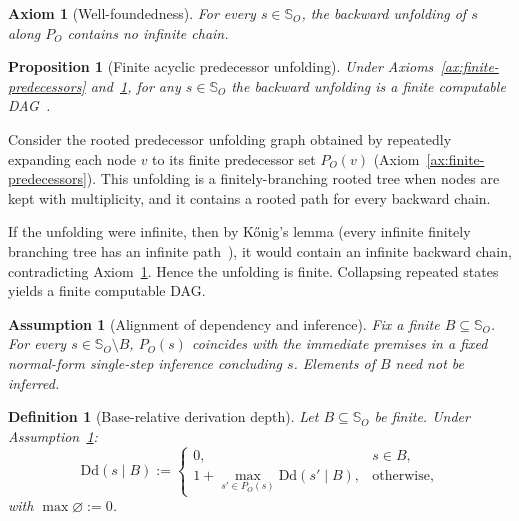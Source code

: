 \documentclass[journal]{IEEEtran}
\makeatletter
\newcommand{\Dd}{\text{Dd}}
\newtheorem{axiom}{Axiom}[section]
\newtheorem{assumption}{Assumption}[section]
\newtheorem{proposition}{Proposition}[section]
\newtheorem{definition}{Definition}[section]
\numberwithin{equation}{section}
\renewenvironment{proof}[1][\proofname]{\par
  \pushQED{\qed}%
  \normalfont \topsep6\p@\@plus6\p@\relax
  \trivlist
  \item[\hskip\labelsep
        \itshape
    #1\@addpunct{.}]\ignorespaces
}{%
  \popQED\endtrivlist\@endpefalse
}
\makeatother
\begin{document}
\begin{axiom}[Well-foundedness]
\label{ax:wellfounded-predecessor}
For every $s\in\mathbb S_O$, the backward unfolding of $s$ along
$P_O$ contains no infinite chain.
\end{axiom}

\begin{proposition}[Finite acyclic predecessor unfolding]
\label{prop:no-cycle-dag}
Under Axioms~\ref{ax:finite-predecessors}
and~\ref{ax:wellfounded-predecessor}, for any $s\in\mathbb S_O$
the backward unfolding is a finite computable
DAG~\cite{kunen2014set}.
\end{proposition}

\begin{proof}
Consider the rooted predecessor unfolding graph obtained by repeatedly expanding
each node \(v\) to its finite predecessor set \(P_O(v)\) (Axiom~\ref{ax:finite-predecessors}).
This unfolding is a finitely-branching rooted tree when nodes are kept with
multiplicity, and it contains a rooted path for every backward chain.

If the unfolding were infinite, then by K\H{o}nig's lemma (every infinite finitely
branching tree has an infinite path~\cite{konig1990theory}), it would contain an infinite backward chain,
contradicting Axiom~\ref{ax:wellfounded-predecessor}.
Hence the unfolding is finite. Collapsing repeated states yields a finite
computable DAG.
\end{proof}

\begin{assumption}[Alignment of dependency and inference]
\label{assump:alignment}
Fix a finite $B\subseteq\mathbb S_O$.
For every $s\in\mathbb S_O\setminus B$, $P_O(s)$ coincides with
the immediate premises in a fixed normal-form single-step
inference concluding $s$.
Elements of $B$ need not be inferred.
\end{assumption}

\begin{definition}[Base-relative derivation depth]
\label{def:derivation-depth}
Let $B\subseteq\mathbb S_O$ be finite.
Under Assumption~\ref{assump:alignment}:
\begin{equation}\label{eq:Dd-inductive}
  \Dd(s\mid B)
  :=
  \begin{cases}
    0, & s\in B,\\[0.3ex]
    1+\displaystyle\max_{s'\in P_O(s)}\Dd(s'\mid B),
      & \text{otherwise},
  \end{cases}
\end{equation}
with $\max\varnothing:=0$.
\end{definition}
\end{document}
